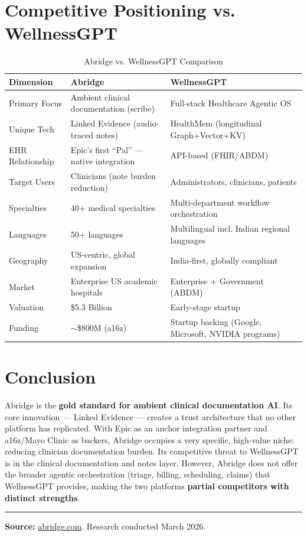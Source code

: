\documentclass[12pt,a4paper]{article}
\begin{document}
\section{Competitive Positioning vs. WellnessGPT}

\begin{table}[H]
\centering
\renewcommand{\arraystretch}{1.5}
\begin{tabularx}{\textwidth}{lXX}
\toprule
\textbf{Dimension} & \textbf{Abridge} & \textbf{WellnessGPT} \\
\midrule
Primary Focus     & Ambient clinical documentation (scribe) & Full-stack Healthcare Agentic OS \\
Unique Tech       & Linked Evidence (audio-traced notes) & HealthMem (longitudinal Graph+Vector+KV) \\
EHR Relationship  & Epic's first ``Pal'' --- native integration & API-based (FHIR/ABDM) \\
Target Users      & Clinicians (note burden reduction) & Administrators, clinicians, patients \\
Specialties       & 40+ medical specialties & Multi-department workflow orchestration \\
Languages         & 50+ languages & Multilingual incl. Indian regional languages \\
Geography         & US-centric, global expansion & India-first, globally compliant \\
Market            & Enterprise US academic hospitals & Enterprise + Government (ABDM) \\
Valuation         & \$5.3 Billion & Early-stage startup \\
Funding           & $\sim$\$800M (a16z) & Startup backing (Google, Microsoft, NVIDIA programs) \\
\bottomrule
\end{tabularx}
\caption{Abridge vs. WellnessGPT Comparison}
\end{table}

\section{Conclusion}

Abridge is the \textbf{gold standard for ambient clinical documentation AI}. Its core innovation --- Linked Evidence --- creates a trust architecture that no other platform has replicated. With Epic as an anchor integration partner and a16z/Mayo Clinic as backers, Abridge occupies a very specific, high-value niche: reducing clinician documentation burden. Its competitive threat to WellnessGPT is in the clinical documentation and notes layer. However, Abridge does not offer the broader agentic orchestration (triage, billing, scheduling, claims) that WellnessGPT provides, making the two platforms \textbf{partial competitors with distinct strengths}.

\vspace{1cm}
\hrule\vspace{0.3cm}
\small\textbf{Source:} \href{https://abridge.com}{abridge.com}. Research conducted March 2026.
\end{document}
